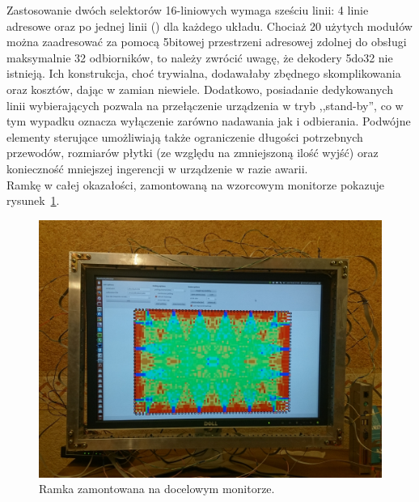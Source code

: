 Zastosowanie dwóch selektorów 16-liniowych wymaga sześciu linii: 4 linie adresowe oraz po jednej linii  () dla każdego układu. Chociaż 20 użytych modułów można zaadresować za pomocą 5\ppauza{}bitowej przestrzeni adresowej zdolnej do obsługi maksymalnie 32 odbiorników, to należy zwrócić uwagę, że dekodery 5\ppauza{}do\ppauza{}32 nie istnieją. Ich konstrukcja, choć trywialna, dodawałaby zbędnego skomplikowania oraz kosztów, dając w zamian niewiele.
Dodatkowo, posiadanie dedykowanych linii wybierających pozwala na przełączenie urządzenia w tryb ,,stand-by'', co w tym wypadku oznacza wyłączenie zarówno nadawania jak i odbierania. Podwójne elementy sterujące umożliwiają także ograniczenie długości potrzebnych przewodów, rozmiarów płytki (ze względu na zmniejszoną ilość wyjść) oraz konieczność mniejszej ingerencji w urządzenie w razie awarii.\\

Ramkę w całej okazałości, zamontowaną na wzorcowym monitorze pokazuje rysunek~\ref{fig:frame_full}.

\begin{figure}
  \myfloatalign
  \vspace{0.1\textheight}
  \includegraphics[width=\textwidth]{gfx/frame_full}
  \caption{Ramka zamontowana na docelowym monitorze.}
  \label{fig:frame_full}
\end{figure}
